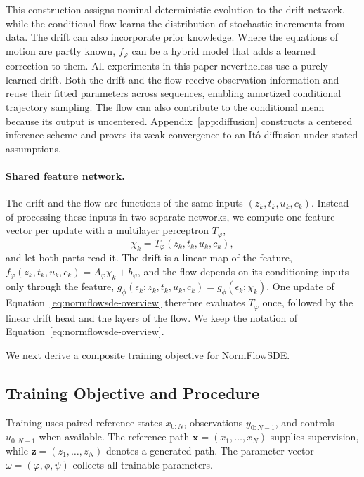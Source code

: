 This construction assigns nominal deterministic evolution to the drift network, while the conditional flow learns the distribution of stochastic increments from data. The drift can also incorporate prior knowledge. Where the equations of motion are partly known, $f_\varphi$ can be a hybrid model that adds a learned correction to them. All experiments in this paper nevertheless use a purely learned drift. Both the drift and the flow receive observation information and reuse their fitted parameters across sequences, enabling amortized conditional trajectory sampling. The flow can also contribute to the conditional mean because its output is uncentered. Appendix~\ref{app:diffusion} constructs a centered inference scheme and proves its weak convergence to an It\^o diffusion under stated assumptions.

\paragraph{Shared feature network.}
The drift and the flow are functions of the same inputs $(z_k,t_k,u_k,c_k)$. Instead of processing these inputs in two separate networks, we compute one feature vector per update with a multilayer perceptron $T_\varphi$,
\begin{equation}\label{eq:shared-feature}
 \chi_k=T_\varphi(z_k,t_k,u_k,c_k),
\end{equation}
and let both parts read it. The drift is a linear map of the feature, $f_\varphi(z_k,t_k,u_k,c_k)=A_\varphi\chi_k+b_\varphi$, and the flow depends on its conditioning inputs only through the feature, $g_\phi(\epsilon_k;z_k,t_k,u_k,c_k)=g_\phi(\epsilon_k;\chi_k)$. One update of Equation~\eqref{eq:normflowsde-overview} therefore evaluates $T_\varphi$ once, followed by the linear drift head and the layers of the flow. We keep the notation of Equation~\eqref{eq:normflowsde-overview}. 

We next derive a composite training objective for NormFlowSDE. 

\subsection{Training Objective and Procedure}\label{sec:training}
Training uses paired reference states $x_{0:N}$, observations $y_{0:N-1}$, and controls $u_{0:N-1}$ when available. The reference path $\mathbf x=(x_1,\ldots,x_N)$ supplies supervision, while $\mathbf z=(z_1,\ldots,z_N)$ denotes a generated path. The parameter vector $\omega=(\varphi,\phi,\psi)$ collects all trainable parameters. 

